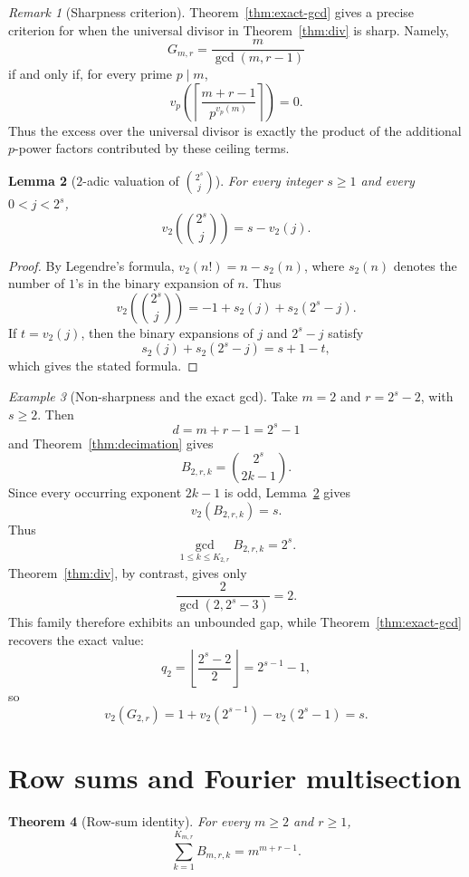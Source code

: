 \documentclass[11pt]{article}
\newtheorem{theorem}{Theorem}[section]
\newtheorem{lemma}[theorem]{Lemma}
\theoremstyle{definition}
\theoremstyle{remark}
\newtheorem{remark}[theorem]{Remark}
\newtheorem{example}[theorem]{Example}
\begin{document}
\begin{remark}[Sharpness criterion]
\label{rem:sharpness}
Theorem~\ref{thm:exact-gcd} gives a precise criterion for when the
universal divisor in Theorem~\ref{thm:div} is sharp. Namely,
\[
 G_{m,r}=\frac{m}{\gcd(m,r-1)}
\]
if and only if, for every prime $p\mid m$,
\[
 v_p\!\left(
 \left\lceil\frac{m+r-1}{p^{v_p(m)}}\right\rceil
 \right)
 =0.
\]
Thus the excess over the universal divisor is exactly the product of the
additional $p$-power factors contributed by these ceiling terms.
\end{remark}

\begin{lemma}[$2$-adic valuation of $\binom{2^s}{j}$]
\label{lem:2adic}
For every integer $s\ge1$ and every $0<j<2^s$,
\[
 v_2\left(\binom{2^s}{j}\right)=s-v_2(j).
\]
\end{lemma}

\begin{proof}
By Legendre's formula, $v_2(n!)=n-s_2(n)$, where $s_2(n)$ denotes the
number of $1$'s in the binary expansion of $n$. Thus
\[
 v_2\left(\binom{2^s}{j}\right)
 =-1+s_2(j)+s_2(2^s-j).
\]
If $t=v_2(j)$, then the binary expansions of $j$ and $2^s-j$ satisfy
\[
 s_2(j)+s_2(2^s-j)=s+1-t,
\]
which gives the stated formula.
\end{proof}

\begin{example}[Non-sharpness and the exact gcd]
\label{ex:nonsharp}
Take $m=2$ and $r=2^s-2$, with $s\ge2$. Then
\[
 d=m+r-1=2^s-1
\]
and Theorem~\ref{thm:decimation} gives
\[
 B_{2,r,k}=\binom{2^s}{2k-1}.
\]
Since every occurring exponent $2k-1$ is odd, Lemma~\ref{lem:2adic}
gives
\[
 v_2(B_{2,r,k})=s.
\]
Thus
\[
 \gcd_{1\le k\le K_{2,r}}B_{2,r,k}=2^s.
\]
Theorem~\ref{thm:div}, by contrast, gives only
\[
 \frac{2}{\gcd(2,2^s-3)}=2.
\]
This family therefore exhibits an unbounded gap, while
Theorem~\ref{thm:exact-gcd} recovers the exact value:
\[
 q_2=\left\lfloor\frac{2^s-2}{2}\right\rfloor=2^{s-1}-1,
\]
so
\[
 v_2(G_{2,r})
 =
 1+v_2(2^{s-1})-v_2(2^s-1)
 =s.
\]
\end{example}

\section{Row sums and Fourier multisection}
\label{sec:rows}

\begin{theorem}[Row-sum identity]
\label{thm:rowsum}
For every $m\ge2$ and $r\ge1$,
\[
 \sum_{k=1}^{K_{m,r}}B_{m,r,k}=m^{m+r-1}.
\]
\end{theorem}
\end{document}
